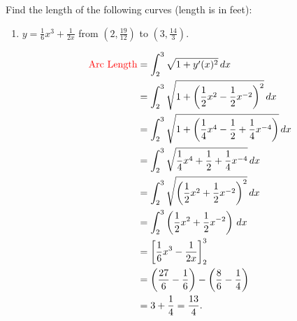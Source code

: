 \documentclass[handout,instructornotes]{ximera}
\begin{document}
\begin{problem}
Find the length of the following curves (length is in feet):
	\begin{enumerate}
		\item  $y = \frac{1}{6} x^3 + \frac{1}{2x}$ from $\left( 2, \frac{19}{12} \right)$ to $\left( 3, \frac{14}{3} \right)$.  
		\begin{freeResponse}
			\begin{align*}
			\text{{\color{red} Arc Length}} &= \int_2^3 \sqrt{1+y'(x)^2} \,d x  \\
			&= \int_2^3 \sqrt{1+ \left( \frac{1}{2}x^2 - \frac{1}{2}x^{-2} \right)^2} \,d x  \\
			&= \int_2^3 \sqrt{1+ \left( \frac{1}{4}x^4 - \frac{1}{2} + \frac{1}{4}x^{-4} \right)} \,d x  \\
			&= \int_2^3 \sqrt{\frac{1}{4}x^4 + \frac{1}{2} + \frac{1}{4}x^{-4}} \,d x  \\
			&= \int_2^3 \sqrt{\left( \frac{1}{2}x^2 + \frac{1}{2}x^{-2} \right)^2} \,d x  \\
			&= \int_2^3 \left( \frac{1}{2}x^2 + \frac{1}{2}x^{-2} \right) \,d x  \\
			&= \bigg[ \frac{1}{6}x^3 - \frac{1}{2x} \bigg]_2^3  \\
			&= \left( \frac{27}{6} - \frac{1}{6} \right) - \left( \frac{8}{6} - \frac{1}{4} \right)  \\
			&= 3 + \frac{1}{4} = \frac{13}{4}.
			\end{align*}
		\end{freeResponse}
		
		
		

\end{enumerate}
\end{problem}
\end{document}
